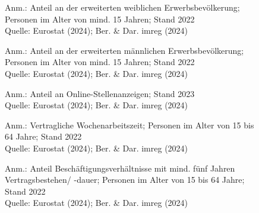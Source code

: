 \begin{figure}[p]
	{\centering {}}
	\label{map:potentialfrauen}
	\begin{spacing}{1} \scriptsize
		Anm.: Anteil an der erweiterten weiblichen Erwerbsbevölkerung; Personen im Alter von mind. 15 Jahren; Stand 2022\\
		Quelle: Eurostat (2024); Ber. \& Dar. imreg (2024) \end{spacing}
\end{figure}


\begin{figure}[p]
	{\centering {}}
	\label{map:potentialmaenner}
	\begin{spacing}{1} \scriptsize
		Anm.: Anteil an der erweiterten männlichen Erwerbsbevölkerung; Personen im Alter von mind. 15 Jahren; Stand 2022\\
		Quelle: Eurostat (2024); Ber. \& Dar. imreg (2024) \end{spacing}
\end{figure}


\begin{figure}[p]
	{\centering {}}
	\label{map:ikt}
	\begin{spacing}{1} \scriptsize
		Anm.: Anteil an Online-Stellenanzeigen; Stand 2023\\
		Quelle: Eurostat (2024); Ber. \& Dar. imreg (2024) \end{spacing}
\end{figure}


\begin{figure}[p]
	{\centering {}}
	\label{map:zeit}
	\begin{spacing}{1} \scriptsize
		Anm.: Vertragliche Wochenarbeitszeit; Personen im Alter von 15 bis 64 Jahre; Stand 2022\\
		Quelle: Eurostat (2024); Ber. \& Dar. imreg (2024) \end{spacing}
\end{figure}


\begin{figure}[p]
	{\centering {}}
	\label{map:lang}
	\begin{spacing}{1} \scriptsize
		Anm.: Anteil Beschäftigungsverhältnisse mit mind. fünf Jahren Vertragsbestehen/ -dauer; Personen im Alter von 15 bis 64 Jahre; Stand 2022\\
		Quelle: Eurostat (2024); Ber. \& Dar. imreg (2024) \end{spacing}
\end{figure}


